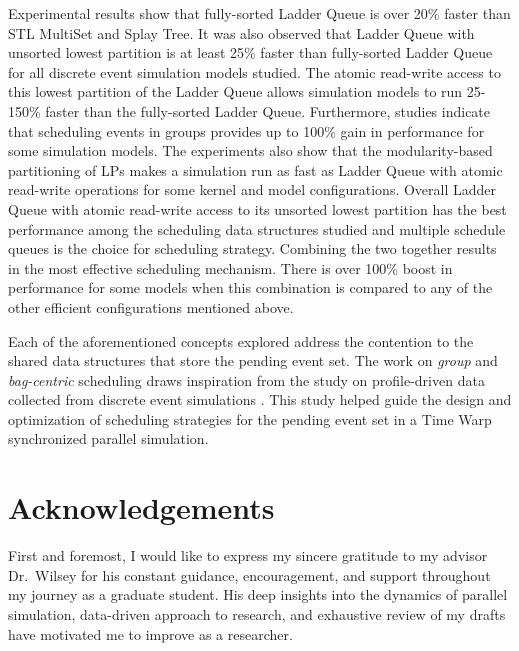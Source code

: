 \documentclass[11pt]{book}
\begin{document}
Experimental results show that fully-sorted Ladder Queue is over 20\% faster than STL MultiSet and Splay Tree.
It was also observed that Ladder Queue with unsorted lowest partition is at least 25\% faster than
fully-sorted Ladder Queue for all discrete event simulation models studied.  The atomic read-write access to
this lowest partition of the Ladder Queue allows simulation models to run 25-150\% faster than the
fully-sorted Ladder Queue.  Furthermore, studies indicate that scheduling events in groups provides up to
100\% gain in performance for some simulation models.  The experiments also show that the modularity-based
partitioning of LPs makes a simulation run as fast as Ladder Queue with atomic read-write operations for some
kernel and model configurations. Overall Ladder Queue with atomic read-write access to its unsorted lowest
partition has the best performance among the scheduling data structures studied and multiple schedule queues
is the choice for scheduling strategy. Combining the two together results in the most effective scheduling
mechanism. There is over 100\% boost in performance for some models when this combination is compared to any
of the other efficient configurations mentioned above.

Each of the aforementioned concepts explored address the contention to the shared data structures that store
the pending event set.  The work on \emph{group} and \emph{bag-centric} scheduling draws inspiration from the
study on profile-driven data collected from discrete event simulations \cite{wilsey-16}.  This study helped
guide the design and optimization of scheduling strategies for the pending event set in a Time Warp
synchronized parallel simulation.

\newpage
\clearpage
\thispagestyle{empty}
\hfill
\clearpage

\newpage
\chapter*{Acknowledgements}

First and foremost, I would like to express my sincere gratitude to my advisor Dr.\ Wilsey for his constant
guidance, encouragement, and support throughout my journey as a graduate student.  His deep insights into
the dynamics of parallel simulation, data-driven approach to research, and exhaustive review of my drafts
have motivated me to improve as a researcher.
\end{document}
